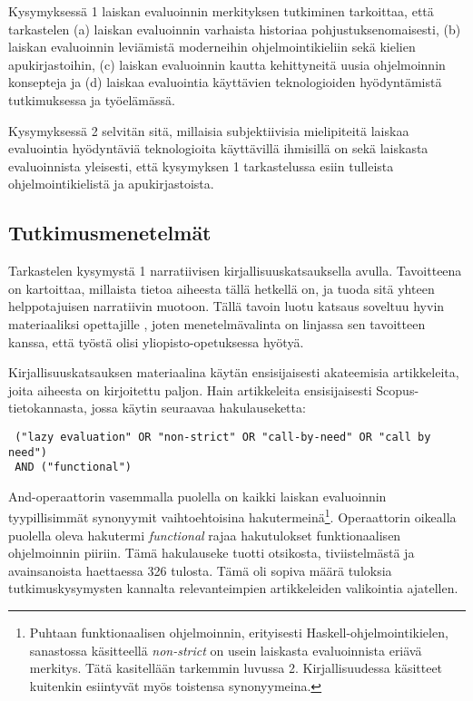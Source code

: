 Kysymyksessä 1 laiskan evaluoinnin merkityksen tutkiminen tarkoittaa, että tarkastelen (a) laiskan evaluoinnin varhaista historiaa pohjustuksenomaisesti, (b) laiskan evaluoinnin leviämistä moderneihin ohjelmointikieliin sekä kielien apukirjastoihin, (c) laiskan evaluoinnin kautta kehittyneitä uusia ohjelmoinnin konsepteja ja (d) laiskaa evaluointia käyttävien teknologioiden hyödyntämistä tutkimuksessa ja työelämässä.

Kysymyksessä 2 selvitän sitä, millaisia subjektiivisia mielipiteitä laiskaa evaluointia hyödyntäviä teknologioita käyttävillä ihmisillä on sekä laiskasta evaluoinnista yleisesti, että kysymyksen 1 tarkastelussa esiin tulleista ohjelmointikielistä ja apukirjastoista.


\subsection{Tutkimusmenetelmät}

Tarkastelen kysymystä 1 narratiivisen kirjallisuuskatsauksella avulla. Tavoitteena on kartoittaa, millaista tietoa aiheesta tällä hetkellä on, ja tuoda sitä yhteen helppotajuisen narratiivin muotoon. Tällä tavoin luotu katsaus soveltuu hyvin materiaaliksi opettajille \citep[s. 312]{baumeister1997writing}, joten menetelmävalinta on linjassa sen tavoitteen kanssa, että työstä olisi yliopisto-opetuksessa hyötyä.

Kirjallisuuskatsauksen materiaalina käytän ensisijaisesti akateemisia artikkeleita, joita aiheesta on kirjoitettu paljon. Hain artikkeleita ensisijaisesti Scopus-tietokannasta, jossa käytin seuraavaa hakulauseketta:

\begin{verbatim}
 ("lazy evaluation" OR "non-strict" OR "call-by-need" OR "call by need")
 AND ("functional")
\end{verbatim}

And-operaattorin vasemmalla puolella on kaikki laiskan evaluoinnin tyypillisimmät synonyymit vaihtoehtoisina hakutermeinä\footnote{Puhtaan funktionaalisen ohjelmoinnin, erityisesti Haskell-ohjelmointikielen, sanastossa käsitteellä \textit{non-strict} on usein laiskasta evaluoinnista eriävä merkitys. Tätä kasitellään tarkemmin luvussa 2. Kirjallisuudessa käsitteet kuitenkin esiintyvät myös toistensa synonyymeina. }. Operaattorin oikealla puolella oleva hakutermi \textit{functional} rajaa hakutulokset funktionaalisen ohjelmoinnin piiriin. Tämä hakulauseke tuotti otsikosta, tiviistelmästä ja avainsanoista haettaessa 326 tulosta. Tämä oli sopiva määrä tuloksia tutkimuskysymysten kannalta relevanteimpien artikkeleiden valikointia ajatellen.

